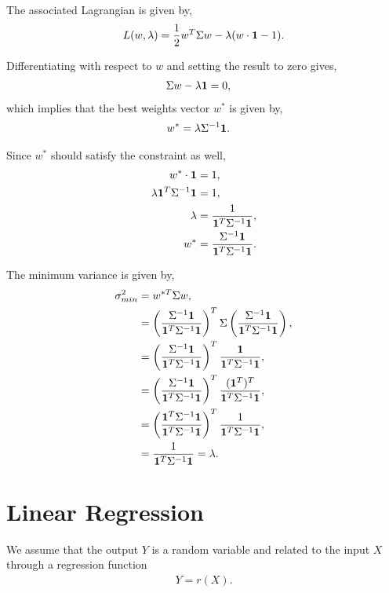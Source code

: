 \documentclass{amsart}
\theoremstyle{plain}
\numberwithin{equation}{section}
\begin{document}
The associated Lagrangian is given by,
\begin{align*}
L(w, \lambda) = \frac{1}{2} w^T\Sigma w - \lambda ( w \cdot {\bf 1} - 1 ).
\end{align*}

Differentiating with respect to $w$ and setting the result to zero gives,
\begin{align*}
\Sigma w - \lambda {\bf 1} & = 0,
\end{align*}
which implies that the best weights vector
$w^*$ is given by,
\begin{align*}
w^* &= \lambda \Sigma^{-1} {\bf 1}.
\end{align*}

Since $w^*$ should satisfy the constraint as well,
\begin{align*}
w^* \cdot {\bf 1} &= 1,\\
\lambda {\bf 1}^T \Sigma^{-1} {\bf 1} &= 1,\\
\lambda &=\frac{1}{{\bf 1}^T \Sigma^{-1} {\bf 1}},\\
w^* &=\frac{\Sigma^{-1} {\bf 1}}{{\bf 1}^T \Sigma^{-1} {\bf 1}}.
\end{align*}

The minimum variance is given by,
\begin{align*}
\sigma_{min}^2 &= w^{*T} \Sigma w,\\
&= \left(\frac{\Sigma^{-1} {\bf 1}}{{\bf 1}^T \Sigma^{-1} {\bf 1}}\right)^T
\Sigma \left(\frac{\Sigma^{-1} {\bf 1}}{{\bf 1}^T \Sigma^{-1} {\bf 1}}\right),\\
&=  \left(\frac{\Sigma^{-1} {\bf 1}}{{\bf 1}^T \Sigma^{-1} {\bf 1}}\right)^T
\frac{{\bf 1}}{{\bf 1}^T \Sigma^{-1} {\bf 1}},\\
&= \left(\frac{\Sigma^{-1} {\bf 1}}{{\bf 1}^T \Sigma^{-1} {\bf 1}}\right)^T
\frac{({\bf 1}^T)^T}{{\bf 1}^T \Sigma^{-1} {\bf 1}},\\
&= \left(\frac{{\bf 1}^T \Sigma^{-1} {\bf 1}}{{\bf 1}^T \Sigma^{-1} {\bf 1}}\right)^T
\frac{1}{{\bf 1}^T \Sigma^{-1} {\bf 1}},\\
&= \frac{1}{{\bf 1}^T \Sigma^{-1} {\bf 1}} = \lambda.
\end{align*}

\section*{Linear Regression}
We assume that the output $Y$ is a
random variable and related to the input
$X$ through a regression function
\begin{align*}
Y = r(X).
\end{align*}
\end{document}
